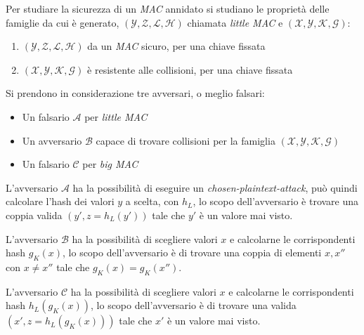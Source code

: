 \vspace{1em}
Per studiare la sicurezza di un \emph{MAC} annidato si studiano le proprietà delle famiglie da cui è generato, $(\mathcal{Y},\mathcal{Z},\mathcal{L},\mathcal{H})$ chiamata \emph{little MAC} e $(\mathcal{X},\mathcal{Y},\mathcal{K},\mathcal{G})$:
\begin{enumerate}
    \item $(\mathcal{Y},\mathcal{Z},\mathcal{L},\mathcal{H})$ da un \emph{MAC} sicuro, per una chiave fissata
    \item $(\mathcal{X},\mathcal{Y},\mathcal{K},\mathcal{G})$ è resistente alle collisioni, per una chiave fissata
\end{enumerate}

\noindent Si prendono in considerazione tre avversari, o meglio falsari:
\begin{itemize}
    \item Un falsario $\mathcal{A}$ per \emph{little MAC} 
    \item Un avversario $\mathcal{B}$ capace di trovare collisioni per la famiglia $(\mathcal{X},\mathcal{Y},\mathcal{K},\mathcal{G})$
    \item Un falsario $\mathcal{C}$ per \emph{big MAC}
\end{itemize}

\begin{definition}
    L'avversario $\mathcal{A}$ ha la possibilità di eseguire un \emph{chosen-plaintext-attack}, può quindi calcolare l'hash dei valori $y$ a scelta, con $h_L$, lo scopo dell'avversario è trovare una coppia valida $(y',z = h_L(y'))$ tale che $y'$ è un valore mai visto.
\end{definition}

\begin{definition}
    L'avversario $\mathcal{B}$ ha la possibilità di scegliere valori $x$ e calcolarne le corrispondenti hash $g_K(x)$, lo scopo dell'avversario è di trovare una coppia di elementi $x,x''$ con $x \neq x''$ tale che $g_K(x) = g_K(x'')$.
\end{definition}

\begin{definition}
    L'avversario $\mathcal{C}$ ha la possibilità di scegliere valori $x$ e calcolarne le corrispondenti hash $h_L(g_K(x))$, lo scopo dell'avversario è di trovare una valida $(x',z = h_L(g_K(x)))$ tale che $x'$ è un valore mai visto.
\end{definition}

